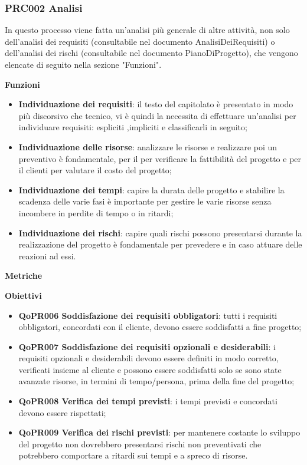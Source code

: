 \documentclass[../paino-di-qualifica.tex]{subfiles}
\begin{document}
\subsubsection{PRC002 Analisi}
\label{sub:analisi}
In questo processo viene fatta un'analisi più generale di altre attività, non solo dell'analisi dei requisiti (consultabile nel documento AnalisiDeiRequisiti) o dell'analisi dei rischi (consultabile nel documento PianoDiProgetto), che vengono elencate di seguito nella sezione "Funzioni".

\textbf{Funzioni}
\begin{itemize}
    \item \textbf{Individuazione dei requisiti}: il testo del capitolato è presentato in modo più discorsivo che tecnico, vi è quindi la necessita di effettuare un'analisi per individuare requisiti: espliciti ,impliciti e classificarli in seguito;
    \item \textbf{Individuazione delle risorse}: analizzare le risorse e realizzare poi un preventivo è fondamentale, per il  per verificare la fattibilità del progetto e per il clienti per valutare il costo del progetto;
    \item \textbf{Individuazione dei tempi}: capire la durata delle progetto e stabilire la scadenza delle varie fasi è importante per gestire le varie risorse senza incombere in perdite di tempo o in ritardi;
    \item \textbf{Individuazione dei rischi}: capire quali rischi possono presentarsi durante la realizzazione del progetto è fondamentale per prevedere e in caso attuare delle reazioni ad essi.
\end{itemize}

\textbf{Metriche}

\textbf{Obiettivi}
\begin{itemize}
    \item \textbf{QoPR006 Soddisfazione dei requisiti obbligatori}: tutti i requisiti obbligatori, concordati con il cliente, devono essere soddisfatti a fine progetto;
    \item \textbf{QoPR007 Soddisfazione dei requisiti opzionali e desiderabili}: i requisiti opzionali e desiderabili devono essere definiti in modo corretto, verificati insieme al cliente e possono essere soddisfatti solo se sono state avanzate risorse, in termini di tempo/persona, prima della fine del progetto;
    \item \textbf{QoPR008 Verifica dei tempi previsti}: i tempi previsti e concordati devono essere rispettati;
    \item \textbf{QoPR009 Verifica dei rischi previsti}: per mantenere costante lo sviluppo del progetto non dovrebbero presentarsi rischi non preventivati che potrebbero comportare a ritardi sui tempi e a spreco di risorse.
\end{itemize}
\end{document}
